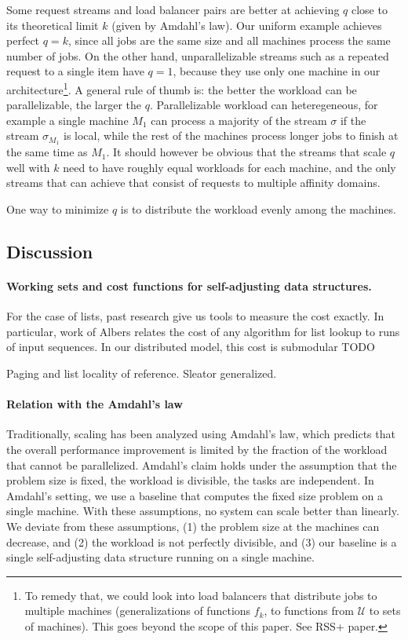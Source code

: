 Some request streams and load balancer pairs are better at achieving $q$ close to its theoretical limit $k$ (given by Amdahl's law). Our uniform example achieves perfect $q=k$, since all jobs are the same size and all machines process the same number of jobs. On the other hand, unparallelizable streams such as a repeated request to a single item have $q=1$, because they use only one machine in our architecture\footnote{To remedy that, we could look into load balancers that distribute jobs to multiple machines (generalizations of functions $f_k$, to functions from $\mathcal{U}$ to sets of machines). This goes beyond the scope of this paper. See RSS+ paper.}.
A general rule of thumb is: the better the workload can be parallelizable, the larger the $q$. Parallelizable workload can heteregeneous, for example a single machine $M_1$ can process a majority of the stream $\sigma$ if the stream $\sigma_{M_1}$ is local, while the rest of the machines process longer jobs to finish at the same time as $M_1$.
It should however be obvious that the streams that scale $q$ well with $k$ need to have roughly equal workloads for each machine, and the only streams that can achieve that consist of requests to multiple affinity domains.

One way to minimize $q$ is to distribute the workload evenly among the machines.

\subsection{Discussion}

\paragraph*{Working sets and cost functions for self-adjusting data structures.}
For the case of lists, past research give us tools to measure the cost exactly. In particular, work of Albers relates the cost of any algorithm for list lookup to runs of input sequences.
In our distributed model, this cost is submodular TODO

Paging and list locality of reference.
Sleator generalized.

\paragraph*{Relation with the Amdahl's law}
Traditionally, scaling has been analyzed using Amdahl's law, which predicts that the overall performance improvement is limited by the fraction of the workload that cannot be parallelized.
Amdahl's claim holds under the assumption that the problem size is fixed, the workload is divisible, the tasks are independent. In Amdahl's setting, we use a baseline that computes the fixed size problem on a single machine. With these assumptions, no system can scale better than linearly.
We deviate from these assumptions, (1) the problem size at the machines can decrease, and (2) the workload is not perfectly divisible, and (3) our baseline is a single self-adjusting data structure running on a single machine.


